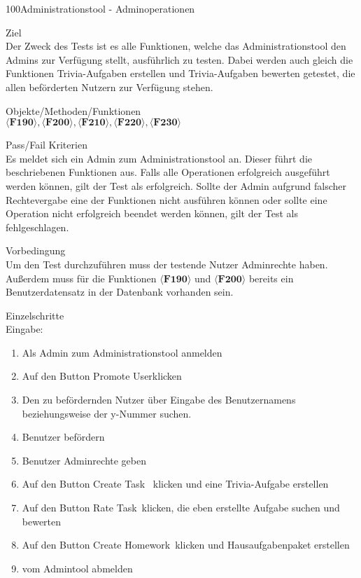 \begin{testcase}{100}{Administrationstool - Adminoperationen}

\item[Ziel]~\\
Der Zweck des Tests ist es alle Funktionen, welche das Administrationstool den Admins zur Verfügung stellt, ausführlich zu testen. Dabei werden auch gleich die Funktionen Trivia-Aufgaben erstellen und Trivia-Aufgaben bewerten getestet, die allen beförderten Nutzern zur Verfügung stehen.

\item[Objekte/Methoden/Funktionen]~\\
$\langle\textbf{F190}\rangle, \langle\textbf{F200}\rangle, \langle\textbf{F210}\rangle, \langle\textbf{F220}\rangle, \langle\textbf{F230}\rangle$ 

\item[Pass/Fail Kriterien]~\\
Es meldet sich ein Admin zum Administrationstool an. Dieser führt die beschriebenen Funktionen aus. Falls alle Operationen erfolgreich ausgeführt werden können, gilt der Test als erfolgreich. Sollte der Admin aufgrund falscher Rechtevergabe eine der Funktionen nicht ausführen können oder sollte eine Operation nicht erfolgreich beendet werden können, gilt der Test als fehlgeschlagen.

\item[Vorbedingung]~\\
Um den Test durchzuführen muss der testende Nutzer Adminrechte haben. Außerdem muss für die Funktionen $\langle\textbf{F190}\rangle$ und $\langle\textbf{F200}\rangle$ bereits ein Benutzerdatensatz in der Datenbank vorhanden sein.

\item[Einzelschritte]~\\

Eingabe:
\begin{enumerate}
\item Als Admin zum Administrationstool anmelden
\item Auf den Button \glqq Promote User\grqq klicken
\item Den zu befördernden Nutzer über Eingabe des Benutzernamens beziehungsweise der y-Nummer suchen.
\item Benutzer befördern
\item Benutzer Adminrechte geben
\item Auf den Button \glqq Create Task \grqq~klicken und eine Trivia-Aufgabe erstellen
\item Auf den Button \glqq Rate Task\grqq~klicken, die eben erstellte Aufgabe suchen und bewerten
\item Auf den Button \glqq Create Homework\grqq~klicken und Hausaufgabenpaket erstellen
\item vom Admintool abmelden
\end{enumerate}



\end{testcase}
